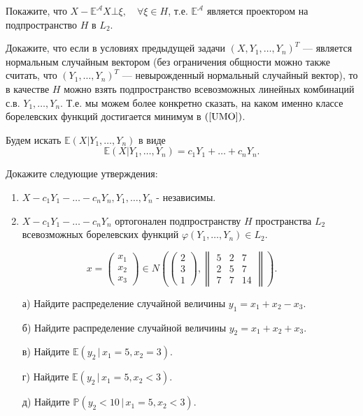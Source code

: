 \begin{ordre}
Покажите, что $X-{\mathbb E}^{\mathcal A}X \bot \xi,\quad \forall\xi\in H$, т.е. ${\mathbb E}^{\mathcal A}$ 
является проектором на подпространство $H$ в $L_2$. 
\end{ordre}


\begin{problem}
Докажите, что если в условиях предыдущей задачи $(X,Y_1,\ldots,Y_n)^T$ --- является нормальным случайным вектором (без ограничения 
общности можно также считать, что $(Y_1,\ldots,Y_n)^T$  --- невырожденный нормальный случайный вектор), то в качестве $H$ можно взять 
подпространство всевозможных линейных комбинаций с.в. $Y_1,\ldots,Y_n$. Т.е. мы можем более конкретно сказать, на каком именно 
классе борелевских функций достигается минимум в $(\ref{UMO})$. 
\end{problem}

\begin{ordre}
Будем искать 
${\mathbb E}(X|Y_1,\ldots,Y_n)$ в виде 
\begin{equation}
\label{Gauss}
{\mathbb E}(X|Y_1,\ldots,Y_n)=c_1 Y_1+\ldots +c_n Y_n . 
\end{equation}

Докажите следующие утверждения:

\begin{enumerate}
\item $X-c_1 Y_1-\ldots-c_n Y_n, Y_1,\ldots, Y_n$ - независимы.
\item $X-c_1 Y_1-\ldots-c_n Y_n$ ортогонален подпространству $H$ пространства $L_2$ всевозможных борелевских функций $\varphi(Y_1,\ldots,Y_n)\in L_2$.
\end{enumerate}
 
\end{ordre}



\begin{problem}
$$
x=\begin{pmatrix}
x_1\\
x_2\\
x_3
\end{pmatrix}
\in N\left(
\begin{pmatrix}
2\\
3\\
1
\end{pmatrix}, 
\begin{Vmatrix}
5 & 2 & 7\\
2 & 5 & 7\\
7 & 7 & 14
\end{Vmatrix}
\right) . 
$$
\begin{enumerate}
\item[а)] Найдите распределение случайной величины $y_1=x_1+x_2-x_3$. 
\item[б)] Найдите распределение случайной величины $y_2=x_1+x_2+x_3$. 
\item[в)] Найдите ${\mathbb E}(y_2\, |\, x_1=5, x_2=3)$. 
\item[г)] Найдите ${\mathbb E}(y_2\, |\, x_1=5, x_2<3)$. 
\item[д)] Найдите ${\mathbb P}(y_2<10\, |\, x_1=5, x_2<3)$. 
\end{enumerate}
\end{problem}

